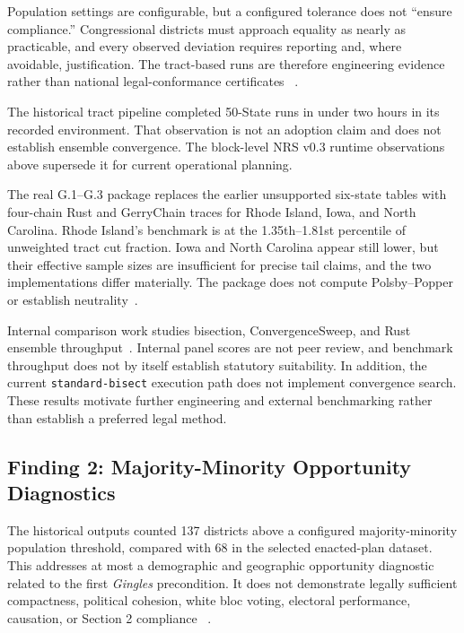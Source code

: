 

Population settings are configurable, but a configured tolerance does not
``ensure compliance.'' Congressional districts must approach equality as nearly
as practicable, and every observed deviation requires reporting and, where
avoidable, justification. The tract-based runs are therefore engineering
evidence rather than national legal-conformance certificates
~\cite{deluca2026recursive}.

The historical tract pipeline completed 50-State runs in under two hours in its
recorded environment. That observation is not an adoption claim and does not
establish ensemble convergence. The block-level NRS v0.3 runtime observations
above supersede it for current operational planning.

The real G.1--G.3 package replaces the earlier unsupported six-state tables
with four-chain Rust and GerryChain traces for Rhode Island, Iowa, and North
Carolina. Rhode Island's benchmark is at the 1.35th--1.81st percentile of
unweighted tract cut fraction. Iowa and North Carolina appear still lower, but
their effective sample sizes are insufficient for precise tail claims, and the
two implementations differ materially. The package does not compute
Polsby--Popper or establish neutrality~\cite{deluca2026ensemble}.

Internal comparison work studies bisection, ConvergenceSweep, and Rust ensemble
throughput~\citep{deluca2026ensemblecomparison,deluca2026redistensemble}.
Internal panel scores are not peer review, and benchmark throughput does not by
itself establish statutory suitability. In addition, the current
\texttt{standard-bisect} execution path does not implement convergence search.
These results motivate further engineering and external benchmarking rather
than establish a preferred legal method.

\subsection{Finding 2: Majority-Minority Opportunity Diagnostics}

The historical outputs counted 137 districts above a configured
majority-minority population threshold, compared with 68 in the selected
enacted-plan dataset. This addresses at most a demographic and geographic
opportunity diagnostic related to the first \emph{Gingles} precondition. It
does not demonstrate legally sufficient compactness, political cohesion, white
bloc voting, electoral performance, causation, or Section 2 compliance
~\cite{deluca2026vra}.

